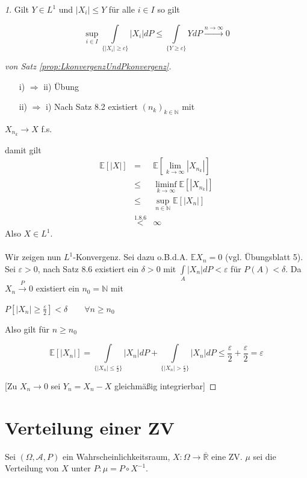 \documentclass[10pt,a4paper]{report}
\newcommand{\E}{\mathbb{E}}
\newcommand{\N}{\mathbb{N}}
\newcommand{\R}{\mathbb{R}}
\numberwithin{equation}{section}
\numberwithin{figure}{section}
\theoremstyle{plain}
\theoremstyle{definition}
\theoremstyle{remark}
\newtheorem{rem}[thm]{\protect\remarkname}
\theoremstyle{plain}
\providecommand{\remarkname}{Bemerkung}
\newcommand{\1}{ \mathbb{1} } %
\begin{document}
\begin{rem}
  Gilt $Y \in L^1$ und $|X_i| \leq Y$ für alle $i \in I$ so gilt
  \begin{center}
    \[\sup\limits_{i \in I} \int\limits_{\{|X_i|\geq c\}}|X_i|dP \leq
    \int\limits_{\{Y \geq c\}}Y dP \overset{n \to \infty}{\to} 0 \]
  \end{center}
\end{rem}
\begin{proof}[von Satz \ref{prop:LkonvergenzUndPkonvergenz}]
  \begin{itemize}
  \item[i) $\Rightarrow$ ii)] Übung
  \item[ii) $\Rightarrow$ i)] Nach Satz 8.2
    existiert $(n_k)_{k \in \N}$ mit
  \end{itemize}
\begin{center}
$X_{n_k} \to X$ f.s.
\end{center}
damit gilt
\begin{eqnarray*}
\E[|X|]&=&\E[\lim\limits_{k \to \infty} |X_{n_k}|]\\
&\leq & \liminf\limits_{k \to \infty} \E[|X_{n_k}|]\\
&\leq & \sup\limits_{n \in \N} \E[|X_n|]\\
&\overset{1.8.6}{<}&\infty
\end{eqnarray*}
Also $X \in L^1$.\\\\
Wir zeigen nun $L^1$-Konvergenz. Sei dazu o.B.d.A. $\E X_n=0$ (vgl. Übungsblatt 5). Sei $\varepsilon >0$, nach Satz 8.6 existiert ein $\delta >0 $ mit $\int\limits_A|X_n|dP<\varepsilon$ für $P(A)<\delta$. Da $X_n \overset{P}{\to} 0$ existiert ein $n_0= \N$ mit
\begin{center}
$P[|X_n|\geq\frac{\varepsilon}{2}]< \delta \qquad \forall n \geq n_0$
\end{center}
Also gilt für $n \geq n_0$
\begin{center}
\[\E[|X_n|]=\int\limits_{\{|X_n|\leq \frac{\varepsilon}{2}\}}|X_n|dP+\int\limits_{\{|X_n|> \frac{\varepsilon}{2}\}}|X_n|dP\leq \frac{\varepsilon}{2}+\frac{\varepsilon}{2}=\varepsilon \]
\end{center}
[Zu $X_n \to 0$ sei $Y_n=X_n-X$ gleichmäßig integrierbar]
\end{proof}
\section{Verteilung einer ZV}
Sei $(\Omega,\mathcal{A},P)$ ein Wahrscheinlichkeitsraum, $X:\Omega \to \overline{\R}$ eine ZV. $\mu$ sei die Verteilung von $X$ unter $P: \mu=P\circ X^{-1}$.
\end{document}
